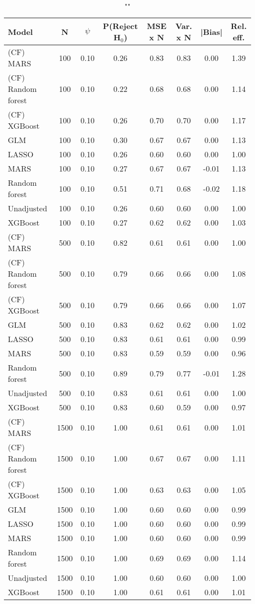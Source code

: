 \begin{table}
\centering
\caption{""}
\begin{tabular}{lccccccc}
\toprule
Model & N & $\psi$ & P(Reject H$_0$) & MSE x N & Var. x N & |Bias| & Rel. eff.\\ \midrule
(CF) MARS & 100 & 0.10 & 0.26 & 0.83 & 0.83 &  0.00 & 1.39 \\ 
(CF) Random forest & 100 & 0.10 & 0.22 & 0.68 & 0.68 &  0.00 & 1.14 \\ 
(CF) XGBoost & 100 & 0.10 & 0.26 & 0.70 & 0.70 &  0.00 & 1.17 \\ 
GLM & 100 & 0.10 & 0.30 & 0.67 & 0.67 &  0.00 & 1.13 \\ 
LASSO & 100 & 0.10 & 0.26 & 0.60 & 0.60 &  0.00 & 1.00 \\ 
MARS & 100 & 0.10 & 0.27 & 0.67 & 0.67 & -0.01 & 1.13 \\ 
Random forest & 100 & 0.10 & 0.51 & 0.71 & 0.68 & -0.02 & 1.18 \\ 
Unadjusted & 100 & 0.10 & 0.26 & 0.60 & 0.60 &  0.00 & 1.00 \\ 
XGBoost & 100 & 0.10 & 0.27 & 0.62 & 0.62 &  0.00 & 1.03 \\ \addlinespace 
(CF) MARS & 500 & 0.10 & 0.82 & 0.61 & 0.61 &  0.00 & 1.00 \\ 
(CF) Random forest & 500 & 0.10 & 0.79 & 0.66 & 0.66 &  0.00 & 1.08 \\ 
(CF) XGBoost & 500 & 0.10 & 0.79 & 0.66 & 0.66 &  0.00 & 1.07 \\ 
GLM & 500 & 0.10 & 0.83 & 0.62 & 0.62 &  0.00 & 1.02 \\ 
LASSO & 500 & 0.10 & 0.83 & 0.61 & 0.61 &  0.00 & 0.99 \\ 
MARS & 500 & 0.10 & 0.83 & 0.59 & 0.59 &  0.00 & 0.96 \\ 
Random forest & 500 & 0.10 & 0.89 & 0.79 & 0.77 & -0.01 & 1.28 \\ 
Unadjusted & 500 & 0.10 & 0.83 & 0.61 & 0.61 &  0.00 & 1.00 \\ 
XGBoost & 500 & 0.10 & 0.83 & 0.60 & 0.59 &  0.00 & 0.97 \\ \addlinespace 
(CF) MARS & 1500 & 0.10 & 1.00 & 0.61 & 0.61 &  0.00 & 1.01 \\ 
(CF) Random forest & 1500 & 0.10 & 1.00 & 0.67 & 0.67 &  0.00 & 1.11 \\ 
(CF) XGBoost & 1500 & 0.10 & 1.00 & 0.63 & 0.63 &  0.00 & 1.05 \\ 
GLM & 1500 & 0.10 & 1.00 & 0.60 & 0.60 &  0.00 & 0.99 \\ 
LASSO & 1500 & 0.10 & 1.00 & 0.60 & 0.60 &  0.00 & 0.99 \\ 
MARS & 1500 & 0.10 & 1.00 & 0.60 & 0.60 &  0.00 & 0.99 \\ 
Random forest & 1500 & 0.10 & 1.00 & 0.69 & 0.69 &  0.00 & 1.14 \\ 
Unadjusted & 1500 & 0.10 & 1.00 & 0.60 & 0.60 &  0.00 & 1.00 \\ 
XGBoost & 1500 & 0.10 & 1.00 & 0.61 & 0.61 &  0.00 & 1.01 \\
\bottomrule
\end{tabular}
\end{table}

